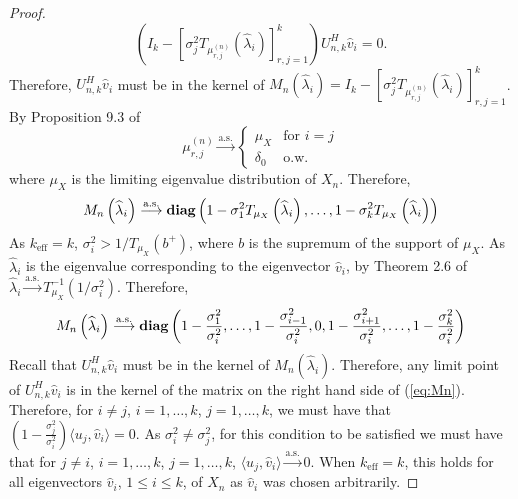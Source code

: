 \begin{proof}
\begin{equation*}
\left(I_k-\left[\sigma_j^2T_{\mu_{r,j}^{\left(n\right)}}\left(\widehat{\lambda}_i\right)\right]_{r,j=1}^k\right)U_{n,k}^H\widehat{v}_i=0.
\end{equation*}
Therefore, $U_{n,k}^H\widehat{v}_i$ must be in the kernel of $M_n\left(\widehat{\lambda}_i\right)=I_k-\left[\sigma_j^2T_{\mu_{r,j}^{\left(n\right)}}\left(\widehat{\lambda}_i\right)\right]_{r,j=1}^k$.
By Proposition 9.3 of \cite{benaych2011eigenvalues}
\begin{equation*}
\mu_{r,j}^{\left(n\right)}\overset{\text{a.s.}}{\longrightarrow}\begin{cases}\mu_X & \text{for } i=j \\ \delta_0 & \text{o.w.} \end{cases}
\end{equation*}
where $\mu_X$ is the limiting eigenvalue distribution of $X_n$. Therefore,
\begin{equation*}
M_n\left(\widehat{\lambda}_i\right)\overset{\text{a.s.}}{\longrightarrow}\mathop{\bf diag}\left(1-\sigma_1^2T_{\mu_X}\left(\widehat{\lambda}_i\right), \dots, 1-\sigma_k^2T_{\mu_X}\left(\widehat{\lambda}_i\right)\right)
\end{equation*}
As $k_\text{eff}=k$, $\sigma_i^2>1/T_{\mu_X}(b^+)$, where $b$ is the supremum of the support of $\mu_X$. As $\widehat{\lambda}_i$ is the eigenvalue corresponding to the eigenvector $\widehat{v}_i$, by Theorem 2.6 of \cite{benaych2011eigenvalues} $\widehat{\lambda}_i\overset{\text{a.s.}}{\longrightarrow}T^{-1}_{\mu_X}\left(1/\sigma_i^2\right)$. Therefore,
\begin{equation}\label{eq:Mn}
M_n\left(\widehat{\lambda}_i\right)\overset{\text{a.s.}}{\longrightarrow}\diag\left(1-\frac{\sigma_1^2}{\sigma_i^2}, \dots, 1-\frac{\sigma_{i-1}^2}{\sigma_i^2}, 0, 1-\frac{\sigma_{i+1}^2}{\sigma_i^2}, \dots, 1-\frac{\sigma_k^2}{\sigma_i^2}\right)
\end{equation}
Recall that $U_{n,k}^H\widehat{v}_i$ must be in the kernel of $M_n\left(\widehat{\lambda}_i\right)$. Therefore, any limit point of $U_{n,k}^H\widehat{v}_i$ is in the kernel of the matrix on the right hand side of (\ref{eq:Mn}). Therefore, for $i\neq j$, $i=1,\dots,k$, $j=1,\dots,k$, we must have that $\left(1-\frac{\sigma_j^2}{\sigma_i^2}\right)\langle u_j,\widehat{v}_i\rangle=0$. As $\sigma_i^2\neq\sigma_j^2$, for this condition to be satisfied we must have that for $j\neq i$, $i=1,\dots,k$, $j=1,\dots,k$, $\langle u_j,\widehat{v}_i\rangle\overset{\text{a.s.}}{\longrightarrow}0$. When $k_\text{eff}=k$, this holds for all eigenvectors $\widehat{v}_i$, $1\leq i\leq k$, of $\widehat{X}_n$ as $\widehat{v}_i$ was chosen arbitrarily.


\end{proof}
